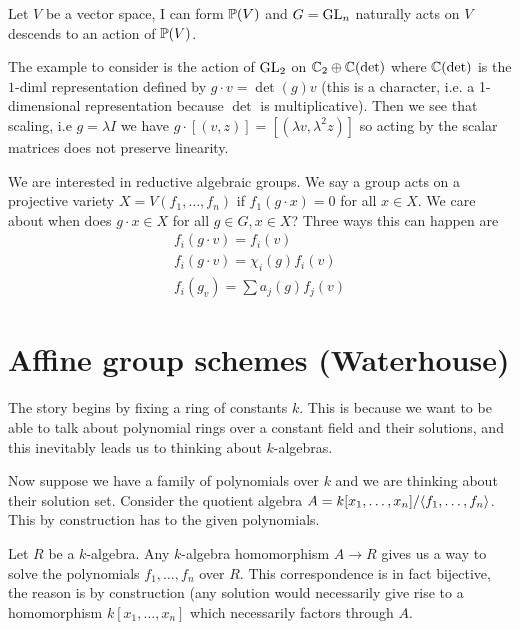 \documentclass[12pt]{article}
\begin{document}
\begin{example}
   Let $V$ be a vector space, I can form $\P(V)$ and $G=\GL_n$ naturally acts on $V$ descends to an action of $\P(V)$.  
   
   \hfill 
   
   The example to consider is the action of $\GL_2$ on $\C_2\oplus\C(\det)$ where $\C(\det)$ is the $1$-diml representation defined by $g\cdot v = \det(g) v$ (this is a character, i.e. a 1-dimensional representation because $\det$ is multiplicative). Then we see that scaling, i.e $g = \lambda I$ we have $g\cdot[(v,z)] = [(\lambda v,\lambda^2 z)]$ so acting by the scalar matrices does not preserve linearity.
   
   
   \hfill
   
\end{example}

We are interested in reductive algebraic groups. We say a group acts on a projective variety $X = V(f_1,\dots,f_n)$ if $f_1(g\cdot x) = 0$ for all $x\in X$. We care about when does $g\cdot x\in X$ for all $g\in G,x\in X$? Three ways this can happen are \begin{align*}
    f_i(g\cdot v) = f_i(v) \\
    f_i(g\cdot v) = \chi_i(g)f_i(v) \\
    f_i(g_v) = \sum a_j(g)f_j(v)
\end{align*} 

\section{Affine group schemes (Waterhouse)}
The story begins by fixing a ring of constants $k$. This is because we want to be able to talk about polynomial rings over a constant field and their solutions, and this inevitably leads us to thinking about $k$-algebras.

\hfill

Now suppose we have a family of polynomials over $k$ and we are thinking about their solution set. Consider the quotient algebra $A = k[x_1,\dots,x_n]/\ideal{f_1,\dots,f_n}$. This by construction has  to the given polynomials. 

\begin{fact}
Let $R$ be a $k$-algebra. Any $k$-algebra homomorphism $A\to R$ gives us a way to solve the polynomials $f_1,\dots,f_n$ over $R$. This correspondence is in fact bijective, the reason is by construction (any solution would necessarily give rise to a homomorphism $k[x_1,\dots,x_n]$ which necessarily factors through $A$.
\end{fact}
\end{document}
